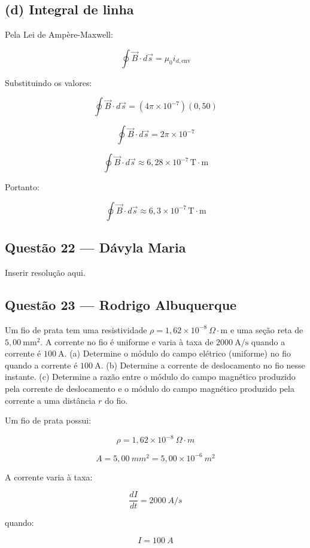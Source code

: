 \documentclass[12pt,a4paper]{article}
\begin{document}
\subsection*{(d) Integral de linha}

Pela Lei de Ampère-Maxwell:

\[
\oint \vec{B}\cdot d\vec{s}
=
\mu_0 i_{d,\text{env}}
\]

Substituindo os valores:

\[
\oint \vec{B}\cdot d\vec{s}
=
(4\pi\times10^{-7})(0,50)
\]

\[
\oint \vec{B}\cdot d\vec{s}
=
2\pi\times10^{-7}
\]

\[
\oint \vec{B}\cdot d\vec{s}
\approx 6,28\times10^{-7}\,\text{T}\cdot\text{m}
\]

Portanto:

\[
\boxed{
\oint \vec{B}\cdot d\vec{s}
\approx 6,3\times10^{-7}\,\text{T}\cdot\text{m}
}
\]

\subsection{Questão 22 — Dávyla Maria}
Inserir resolução aqui.

\subsection{Questão 23 — Rodrigo Albuquerque}

Um fio de prata tem uma resistividade $\rho = 1,62 \times 10^{-8}\ \Omega\cdot\text{m}$ e uma seção reta de $5,00\ \text{mm}^2$. A corrente no fio é uniforme e varia à taxa de $2000\ \text{A/s}$ quando a corrente é $100\ \text{A}$. (a) Determine o módulo do campo elétrico (uniforme) no fio quando a corrente é $100\ \text{A}$. (b) Determine a corrente de deslocamento no fio nesse instante. (c) Determine a razão entre o módulo do campo magnético produzido pela corrente de deslocamento e o módulo do campo magnético produzido pela corrente a uma distância $r$ do fio.


Um fio de prata possui:

\[
\rho=1,62\times10^{-8}\ \Omega\cdot m
\]

\[
A=5,00\ mm^2=5,00\times10^{-6}\ m^2
\]

A corrente varia à taxa:

\[
\frac{dI}{dt}=2000\ A/s
\]

quando:

\[
I=100\ A
\]

\vspace{0.5cm}
\end{document}

